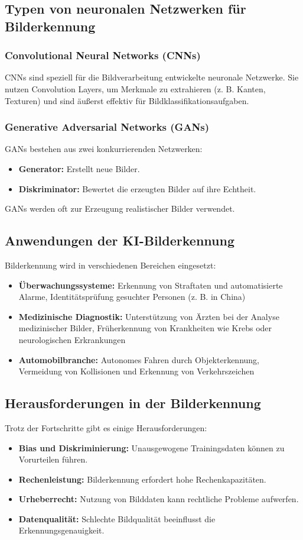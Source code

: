 \documentclass[a4paper,12pt]{article}
\begin{document}
\subsection{Typen von neuronalen Netzwerken für Bilderkennung}

\subsubsection{Convolutional Neural Networks (CNNs)}
CNNs sind speziell für die Bildverarbeitung entwickelte neuronale Netzwerke. Sie nutzen Convolution Layers, um Merkmale zu extrahieren (z. B. Kanten, Texturen) und sind äußerst effektiv für Bildklassifikationsaufgaben.

\subsubsection{Generative Adversarial Networks (GANs)}
GANs bestehen aus zwei konkurrierenden Netzwerken:
\begin{itemize}
    \item \textbf{Generator:} Erstellt neue Bilder.
    \item \textbf{Diskriminator:} Bewertet die erzeugten Bilder auf ihre Echtheit.
\end{itemize}
GANs werden oft zur Erzeugung realistischer Bilder verwendet.

\subsection{Anwendungen der KI-Bilderkennung}
Bilderkennung wird in verschiedenen Bereichen eingesetzt:
\begin{itemize}
    \item \textbf{Überwachungssysteme:} Erkennung von Straftaten und automatisierte Alarme, Identitätsprüfung gesuchter Personen (z. B. in China)
    \item \textbf{Medizinische Diagnostik:} Unterstützung von Ärzten bei der Analyse medizinischer Bilder, Früherkennung von Krankheiten wie Krebs oder neurologischen Erkrankungen
    \item \textbf{Automobilbranche:} Autonomes Fahren durch Objekterkennung, Vermeidung von Kollisionen und Erkennung von Verkehrszeichen
\end{itemize}

\subsection{Herausforderungen in der Bilderkennung}
Trotz der Fortschritte gibt es einige Herausforderungen:
\begin{itemize}
    \item \textbf{Bias und Diskriminierung:} Unausgewogene Trainingsdaten können zu Vorurteilen führen.
    \item \textbf{Rechenleistung:} Bilderkennung erfordert hohe Rechenkapazitäten.
    \item \textbf{Urheberrecht:} Nutzung von Bilddaten kann rechtliche Probleme aufwerfen.
    \item \textbf{Datenqualität:} Schlechte Bildqualität beeinflusst die Erkennungsgenauigkeit.
\end{itemize}
\end{document}
